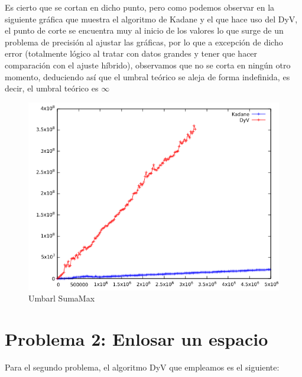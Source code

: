 \documentclass[11pt,openany]{book}
\begin{document}
Es cierto que se cortan en dicho punto, pero como podemos observar en la siguiente gráfica que muestra el algoritmo de Kadane y el que hace uso
del DyV, el punto de corte se encuentra muy al inicio de los valores lo que surge de un problema de precisión al ajustar las gráficas, por lo que a excepción
de dicho error (totalmente lógico al tratar con datos grandes y tener que hacer comparación con el ajuste híbrido), observamos que no se corta en ningún otro momento,
deduciendo así que el umbral teórico se aleja de forma indefinida, es decir, el umbral teórico es $\infty$
\begin{center}
      \begin{figure}[H]
            \centering
            \includegraphics[width=0.7\linewidth]{assets/Img/SumaMax_Umbral.png}
            \caption{Umbarl SumaMax}
            \label{fig:Umbral}
      \end{figure}
\end{center}

\section{Problema 2: Enlosar un espacio }
Para el segundo problema, el algoritmo DyV que empleamos es el siguiente:
\end{document}

